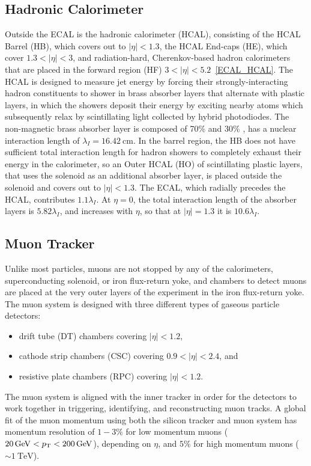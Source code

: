\subsection{Hadronic Calorimeter}
Outside the ECAL is the hadronic calorimeter (HCAL), consisting of the HCAL Barrel (HB), which covers out to $\vert \eta \vert < 1.3$, the HCAL End-caps (HE), which cover $1.3 < \vert \eta \vert < 3$, and radiation-hard, Cherenkov-based hadron calorimeters that are placed in the forward region (HF) $3 < \vert \eta \vert < 5.2$~\ref{ECAL_HCAL}.
The HCAL is designed to measure jet energy by forcing their strongly-interacting hadron constituents to shower in brass absorber layers that alternate with plastic layers, in which the showers deposit their energy by exciting nearby atoms which subsequently relax by scintillating light collected by hybrid photodiodes.
The non-magnetic brass absorber layer is composed of 70\%  and 30\% , has a nuclear interaction length of $\lambda_I = \SI{16.42}{\cm}$.
In the barrel region, the HB does not have sufficient total interaction length for hadron showers to completely exhaust their energy in the calorimeter, so an Outer HCAL (HO) of scintillating plastic layers, that uses the solenoid as an additional absorber layer, is placed outside the solenoid and covers out to $\vert \eta \vert < 1.3$.
The ECAL, which radially precedes the HCAL, contributes $1.1\lambda_I$.
At $\eta = 0$, the total interaction length of the absorber layers is $5.82\lambda_I$, and increases with $\eta$, so that at $\vert \eta \vert = 1.3$ it is $10.6\lambda_I$.

\subsection{Muon Tracker}
Unlike most particles, muons are not stopped by any of the calorimeters, superconducting solenoid, or iron flux-return yoke, and chambers to detect muons are placed at the very outer layers of the experiment in the iron flux-return yoke. 
The muon system is designed with three different types of gaseous particle detectors: 
\begin{itemize}
\item drift tube (DT) chambers covering $\vert \eta \vert < 1.2$,
\item cathode strip chambers (CSC) covering $0.9 < \vert \eta \vert < 2.4$, and
\item resistive plate chambers (RPC) covering $\vert \eta \vert < 1.2$.
\end{itemize}
The muon system is aligned with the inner tracker in order for the detectors to work together in triggering, identifying, and reconstructing muon tracks.
A global fit of the muon momentum using both the silicon tracker and muon system has momentum resolution of $1-3\%$ for low momentum muons ($\SI{20}{\GeV} < \pT < \SI{200}{\GeV}$), depending on $\eta$, and $5\%$ for high momentum muons ($\sim \SI{1}{\TeV}$).


